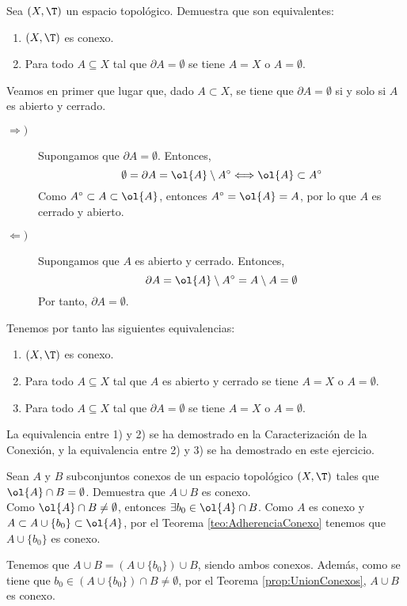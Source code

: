 \begin{ejercicio}
    Sea $(X, \T)$ un espacio topológico. Demuestra que son equivalentes:
    \begin{enumerate}
        \item $(X, \T)$ es conexo.
        \item Para todo $A \subseteq X$ tal que $\partial A = \emptyset$ se tiene $A = X$ o $A = \emptyset$.
    \end{enumerate}

    Veamos en primer que lugar que, dado $A\subset X$, se tiene que $\partial A=\emptyset$ si y solo si $A$ es abierto y cerrado.
    \begin{description}
        \item[$\Longrightarrow)$]  Supongamos que $\partial A=\emptyset$. Entonces,
        \begin{equation*}
            \emptyset = \partial A = \ol{A} \setminus A^\circ \Longleftrightarrow \ol{A} \subset A^\circ
        \end{equation*}
        Como $A^\circ \subset A\subset \ol{A}$, entonces $A^\circ = \ol{A} = A$, por lo que $A$ es cerrado y abierto.

        \item[$\Longleftarrow)$] Supongamos que $A$ es abierto y cerrado. Entonces,
        \begin{equation*}
            \partial A = \ol{A} \setminus A^\circ = A \setminus A = \emptyset
        \end{equation*}
        Por tanto, $\partial A=\emptyset$.
    \end{description}

    Tenemos por tanto las siguientes equivalencias:
    \begin{enumerate}
        \item $(X, \T)$ es conexo.
        \item Para todo $A \subseteq X$ tal que $A$ es abierto y cerrado se tiene $A = X$ o $A = \emptyset$.
        \item Para todo $A \subseteq X$ tal que $\partial A = \emptyset$ se tiene $A = X$ o $A = \emptyset$.
    \end{enumerate}
    La equivalencia entre 1) y 2) se ha demostrado en la Caracterización de la Conexión, y la equivalencia entre 2) y 3) se ha demostrado en este ejercicio.
\end{ejercicio}

\begin{ejercicio}
    Sean $A$ y $B$ subconjuntos conexos de un espacio topológico $(X, \T)$ tales que $\ol{A} \cap B = \emptyset$. Demuestra que $A \cup B$ es conexo.\\

    Como $\ol{A}\cap B\neq \emptyset$, entonces $\exists b_0\in \ol{A}\cap B$. Como $A$ es conexo y $A\subset A\cup \{b_0\}\subset \ol{A}$, por el Teorema \ref{teo:AdherenciaConexo}
    tenemos que $A\cup \{b_0\}$ es conexo.

    Tenemos que $A\cup B = \left(A\cup \{b_0\}\right)\cup B$, siendo ambos conexos. Además, como se tiene que $b_0\in \left(A\cup \{b_0\}\right)\cap B\neq \emptyset$, por el Teorema \ref{prop:UnionConexos}, $A\cup B$ es conexo.
\end{ejercicio}

